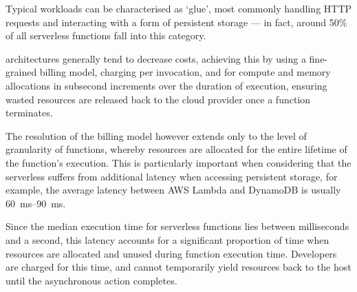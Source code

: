 \documentclass[a4paper,twocolumn]{article}
\begin{document}
Typical \faas{} workloads can be characterised as `glue', most commonly handling HTTP requests and interacting with a form of persistent storage --- in fact, around 50\% of all serverless functions fall into this category\cite{review-of-serverless-use-cases-and-characteristics}.

\faas{} architectures generally tend to decrease costs, achieving this by using a fine-grained billing model, charging per invocation, and for compute and memory allocations in subsecond increments over the duration of execution, ensuring wasted resources are released back to the cloud provider once a function terminates.

The resolution of the billing model however extends only to the level of granularity of functions, whereby resources are allocated for the entire lifetime of the function's execution. This is particularly important when considering that the serverless suffers from additional latency when accessing persistent storage, for example, the average latency between AWS Lambda and DynamoDB is usually \qtyrange{60}{90}{\ms}\cite{caching-techniques-improve-latency-serverless}.

Since the median execution time for serverless functions lies between milliseconds and a second\cite{review-of-serverless-use-cases-and-characteristics}, this latency accounts for a significant proportion of time when resources are allocated and unused during function execution time. Developers are charged for this time, and cannot temporarily yield resources back to the host until the asynchronous action completes.

\printbibliography
\end{document}
